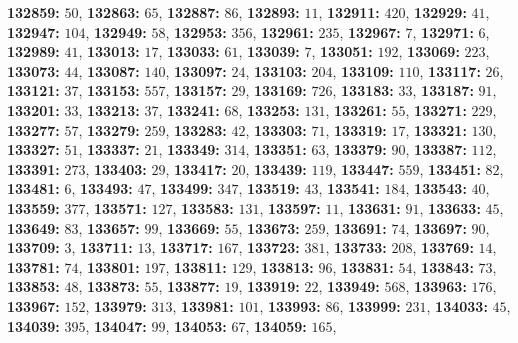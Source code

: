 \textsf{\bfseries 132859:} $50$, \textsf{\bfseries 132863:} $65$, \textsf{\bfseries 132887:} $86$, \textsf{\bfseries 132893:} $11$, \textsf{\bfseries 132911:} $420$, \textsf{\bfseries 132929:} $41$, \textsf{\bfseries 132947:} $104$, \textsf{\bfseries 132949:} $58$, \textsf{\bfseries 132953:} $356$, \textsf{\bfseries 132961:} $235$, \textsf{\bfseries 132967:} $7$, \textsf{\bfseries 132971:} $6$, \textsf{\bfseries 132989:} $41$, \textsf{\bfseries 133013:} $17$, \textsf{\bfseries 133033:} $61$, \textsf{\bfseries 133039:} $7$, \textsf{\bfseries 133051:} $192$, \textsf{\bfseries 133069:} $223$, \textsf{\bfseries 133073:} $44$, \textsf{\bfseries 133087:} $140$, \textsf{\bfseries 133097:} $24$, \textsf{\bfseries 133103:} $204$, \textsf{\bfseries 133109:} $110$, \textsf{\bfseries 133117:} $26$, \textsf{\bfseries 133121:} $37$, \textsf{\bfseries 133153:} $557$, \textsf{\bfseries 133157:} $29$, \textsf{\bfseries 133169:} $726$, \textsf{\bfseries 133183:} $33$, \textsf{\bfseries 133187:} $91$, \textsf{\bfseries 133201:} $33$, \textsf{\bfseries 133213:} $37$, \textsf{\bfseries 133241:} $68$, \textsf{\bfseries 133253:} $131$, \textsf{\bfseries 133261:} $55$, \textsf{\bfseries 133271:} $229$, \textsf{\bfseries 133277:} $57$, \textsf{\bfseries 133279:} $259$, \textsf{\bfseries 133283:} $42$, \textsf{\bfseries 133303:} $71$, \textsf{\bfseries 133319:} $17$, \textsf{\bfseries 133321:} $130$, \textsf{\bfseries 133327:} $51$, \textsf{\bfseries 133337:} $21$, \textsf{\bfseries 133349:} $314$, \textsf{\bfseries 133351:} $63$, \textsf{\bfseries 133379:} $90$, \textsf{\bfseries 133387:} $112$, \textsf{\bfseries 133391:} $273$, \textsf{\bfseries 133403:} $29$, \textsf{\bfseries 133417:} $20$, \textsf{\bfseries 133439:} $119$, \textsf{\bfseries 133447:} $559$, \textsf{\bfseries 133451:} $82$, \textsf{\bfseries 133481:} $6$, \textsf{\bfseries 133493:} $47$, \textsf{\bfseries 133499:} $347$, \textsf{\bfseries 133519:} $43$, \textsf{\bfseries 133541:} $184$, \textsf{\bfseries 133543:} $40$, \textsf{\bfseries 133559:} $377$, \textsf{\bfseries 133571:} $127$, \textsf{\bfseries 133583:} $131$, \textsf{\bfseries 133597:} $11$, \textsf{\bfseries 133631:} $91$, \textsf{\bfseries 133633:} $45$, \textsf{\bfseries 133649:} $83$, \textsf{\bfseries 133657:} $99$, \textsf{\bfseries 133669:} $55$, \textsf{\bfseries 133673:} $259$, \textsf{\bfseries 133691:} $74$, \textsf{\bfseries 133697:} $90$, \textsf{\bfseries 133709:} $3$, \textsf{\bfseries 133711:} $13$, \textsf{\bfseries 133717:} $167$, \textsf{\bfseries 133723:} $381$, \textsf{\bfseries 133733:} $208$, \textsf{\bfseries 133769:} $14$, \textsf{\bfseries 133781:} $74$, \textsf{\bfseries 133801:} $197$, \textsf{\bfseries 133811:} $129$, \textsf{\bfseries 133813:} $96$, \textsf{\bfseries 133831:} $54$, \textsf{\bfseries 133843:} $73$, \textsf{\bfseries 133853:} $48$, \textsf{\bfseries 133873:} $55$, \textsf{\bfseries 133877:} $19$, \textsf{\bfseries 133919:} $22$, \textsf{\bfseries 133949:} $568$, \textsf{\bfseries 133963:} $176$, \textsf{\bfseries 133967:} $152$, \textsf{\bfseries 133979:} $313$, \textsf{\bfseries 133981:} $101$, \textsf{\bfseries 133993:} $86$, \textsf{\bfseries 133999:} $231$, \textsf{\bfseries 134033:} $45$, \textsf{\bfseries 134039:} $395$, \textsf{\bfseries 134047:} $99$, \textsf{\bfseries 134053:} $67$, \textsf{\bfseries 134059:} $165$, 
